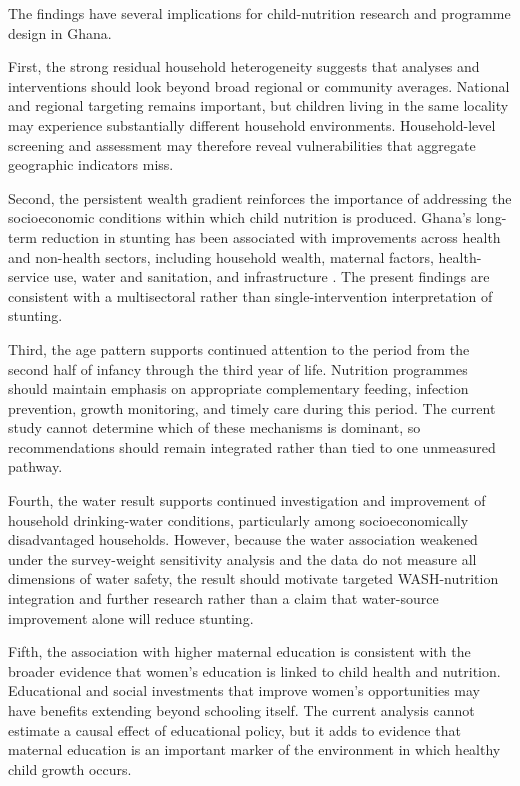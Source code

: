 The findings have several implications for child-nutrition research and programme design in Ghana.

First, the strong residual household heterogeneity suggests that analyses and interventions should look beyond broad regional or community averages. National and regional targeting remains important, but children living in the same locality may experience substantially different household environments. Household-level screening and assessment may therefore reveal vulnerabilities that aggregate geographic indicators miss.

Second, the persistent wealth gradient reinforces the importance of addressing the socioeconomic conditions within which child nutrition is produced. Ghana's long-term reduction in stunting has been associated with improvements across health and non-health sectors, including household wealth, maternal factors, health-service use, water and sanitation, and infrastructure \citep{OtooEtAl2025}. The present findings are consistent with a multisectoral rather than single-intervention interpretation of stunting.

Third, the age pattern supports continued attention to the period from the second half of infancy through the third year of life. Nutrition programmes should maintain emphasis on appropriate complementary feeding, infection prevention, growth monitoring, and timely care during this period. The current study cannot determine which of these mechanisms is dominant, so recommendations should remain integrated rather than tied to one unmeasured pathway.

Fourth, the water result supports continued investigation and improvement of household drinking-water conditions, particularly among socioeconomically disadvantaged households. However, because the water association weakened under the survey-weight sensitivity analysis and the data do not measure all dimensions of water safety, the result should motivate targeted WASH-nutrition integration and further research rather than a claim that water-source improvement alone will reduce stunting.

Fifth, the association with higher maternal education is consistent with the broader evidence that women's education is linked to child health and nutrition. Educational and social investments that improve women's opportunities may have benefits extending beyond schooling itself. The current analysis cannot estimate a causal effect of educational policy, but it adds to evidence that maternal education is an important marker of the environment in which healthy child growth occurs.

